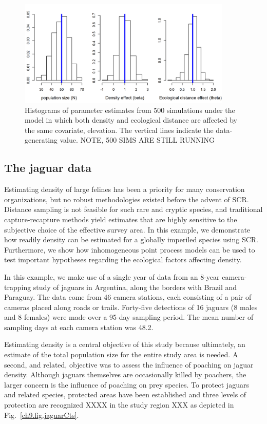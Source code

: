 \begin{figure}
\centering
\includegraphics[width=4in,height=2in]{Ch11/figs/scrDEDsim}
\caption{Histograms of parameter estimates from 500 simulations under
  the model in which both density and ecological distance are affected
by the same covariate, elevation. The vertical lines indicate the
data-generating value. NOTE, 500 SIMS ARE STILL RUNNING}
\label{ch9.fig.sim}
\end{figure}





\subsection{The jaguar data}

Estimating density of large felines has been a priority for many
conservation organizations, but no robust methodologies existed before
the advent of SCR. Distance sampling is not feasible for such rare and
cryptic species, and traditional capture-recapture methods yield
estimates that are highly sensitive to the subjective choice of the
effective survey area. In this example, we
demonstrate how readily density can be estimated for a
globally imperiled species using SCR. Furthermore, we show how
inhomogeneous point process models can be used to test important
hypotheses regarding the ecological factors affecting density.

In this example, we make use of a single year of data from an 8-year
camera-trapping study of jaguars in Argentina,
along the borders with Brazil and Paraguay. The data come from 46
camera stations, each consisting of a pair of cameras placed along
roads or trails. Forty-five detections of 16 jaguars (8 males and 8
females) were made over a 95-day sampling period. The mean number of
sampling days at each camera station was 48.2.

Estimating density is a central objective of this study because
ultimately, an estimate of the total population size for the entire
study area is needed. A second, and related, objective was to assess
the influence of poaching on jaguar density. Although jaguars
themselves are occasionally killed by poachers, the larger concern is
the influence of poaching on prey species. To protect jaguars and
related species, protected areas have
been established and three levels of protection are
recognized XXXX in the study region XXX as depicted in Fig.~\ref{ch9.fig.jaguarCts}.

